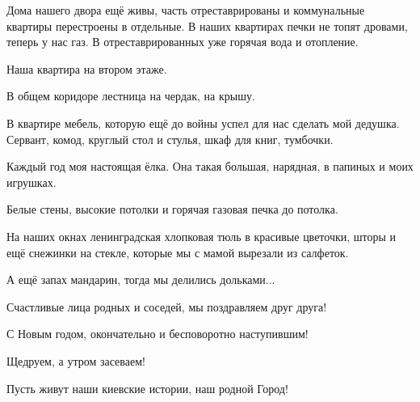 Дома нашего двора ещё живы, часть отреставрированы и коммунальные квартиры
перестроены в отдельные. В наших квартирах печки не топят дровами, теперь у нас
газ. В отреставрированных уже горячая вода и отопление.

Наша квартира на втором этаже.

В общем коридоре лестница на чердак, на крышу. 


В квартире мебель, которую ещё до войны успел для нас сделать мой дедушка.
Сервант, комод, круглый стол и стулья, шкаф для книг, тумбочки.

Каждый год моя настоящая ёлка. Она такая большая, нарядная, в папиных и моих
игрушках.

Белые стены, высокие потолки и горячая газовая печка до потолка.

На наших окнах ленинградская хлопковая тюль в красивые цветочки, шторы и ещё
снежинки на стекле, которые мы с мамой вырезали из салфеток.

А ещё запах мандарин, тогда мы делились дольками...

Счастливые лица родных и соседей, мы поздравляем друг друга!

С Новым годом, окончательно и бесповоротно наступившим! 

Щедруем, а утром засеваем!

Пусть живут наши киевские истории, наш родной Город!
